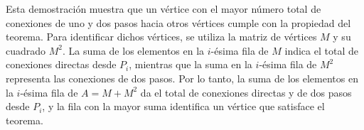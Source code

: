 Esta demostración muestra que un vértice con el mayor número total de conexiones de uno y dos pasos hacia otros vértices cumple con la propiedad del teorema. Para identificar dichos vértices, se utiliza la matriz de vértices $M$ y su cuadrado $M^2$. La suma de los elementos en la $i$-ésima fila de $M$ indica el total de conexiones directas desde $P_i$, mientras que la suma en la $i$-ésima fila de $M^2$ representa las conexiones de dos pasos. Por lo tanto, la suma de los elementos en la $i$-ésima fila de $A = M + M^2$ da el total de conexiones directas y de dos pasos desde $P_i$, y la fila con la mayor suma identifica un vértice que satisface el teorema.
